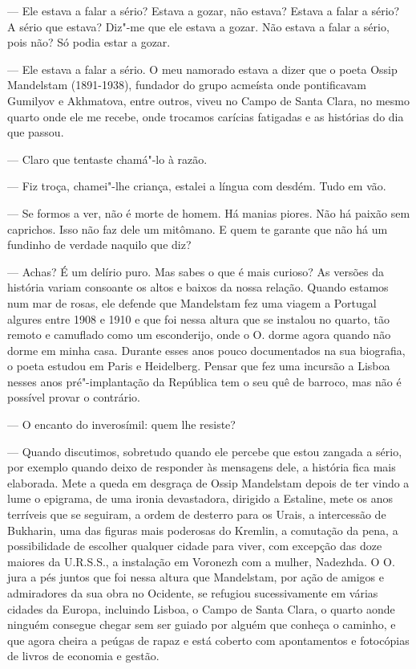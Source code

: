 --- Ele estava a falar a sério? Estava a gozar, não estava? Estava a falar
  a sério? A sério que estava? Diz"-me que ele estava a gozar. Não estava
  a falar a sério, pois não? Só podia estar a gozar.

--- Ele estava a falar a sério. O meu namorado estava a dizer que o poeta
  Ossip Mandelstam (1891-1938), fundador do grupo acmeísta onde
  pontificavam Gumilyov e Akhmatova, entre outros, viveu no Campo de
  Santa Clara, no mesmo quarto onde ele me recebe, onde trocamos
  carícias fatigadas e as histórias do dia que passou.

--- Claro que tentaste chamá"-lo à razão.

--- Fiz troça, chamei"-lhe criança, estalei a língua com desdém. Tudo em
  vão.

--- Se formos a ver, não é morte de homem. Há manias piores. Não há paixão
  sem caprichos. Isso não faz dele um mitômano. E quem te garante que
  não há um fundinho de verdade naquilo que diz?

--- Achas? É um delírio puro. Mas sabes o que é mais
curioso? As versões da história variam consoante os altos e baixos da
nossa relação. Quando estamos num mar de rosas, ele defende que
Mandelstam fez uma viagem a Portugal algures entre 1908 e 1910 e que foi
nessa altura que se instalou no quarto, tão remoto e camuflado como um
esconderijo, onde o
O. dorme agora quando não dorme em minha casa. Durante esses anos pouco
documentados na sua biografia, o poeta estudou em Paris e Heidelberg.
Pensar que fez uma incursão a Lisboa nesses anos pré"-implantação da
República tem o seu quê de barroco, mas não é possível provar o
contrário.

--- O encanto do inverosímil: quem lhe resiste?

--- Quando discutimos, sobretudo quando ele percebe que estou zangada a
  sério, por exemplo quando deixo de responder às mensagens dele, a
  história fica mais elaborada. Mete a queda em desgraça de Ossip
  Mandelstam depois de ter vindo a lume o epigrama, de uma ironia
  devastadora, dirigido a Estaline, mete os anos terríveis que se
  seguiram, a ordem de desterro para os Urais, a intercessão de
  Bukharin, uma das figuras mais poderosas do Kremlin, a comutação da
  pena, a possibilidade de escolher qualquer cidade para viver, com
  excepção das doze maiores da U.R.S.S., a instalação em Voronezh com a
  mulher, Nadezhda. O O. jura a pés juntos que foi nessa altura que
  Mandelstam, por ação de amigos e admiradores da sua obra no Ocidente,
  se refugiou sucessivamente em várias cidades da Europa, incluindo
  Lisboa, o Campo de Santa Clara, o quarto aonde ninguém consegue chegar
  sem ser guiado por alguém que conheça o caminho, e que agora cheira a
  peúgas de rapaz e está coberto com apontamentos e fotocópias de livros
  de economia e gestão.

